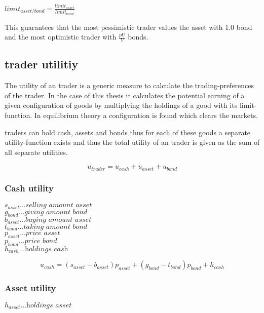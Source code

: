 \documentclass[../Bachelorarbeit.tex]{subfiles}
\begin{document}
\begin{center}
$limit_{asset/bond} = \frac{limit_{asset}}{limit_{bond}}$
\end{center}

This guarantees that the most pessimistic trader values the asset with 1.0 bond and the most optimistic trader with $\frac{pU}{V}$ bonds.

\subsection{trader utilitiy}
The utility of an trader is a generic measure to calculate the trading-preferences of the trader. In the case of this thesis it calculates the potential earning of a given configuration of goods by multiplying the holdings of a good with its limit-function. In equilibrium theory a configuration is found which clears the markets.

\medskip

traders can hold cash, assets and bonds thus for each of these goods a separate utility-function exists and thus the total utility of an trader is given as the sum of all separate utilities.

\begin{equation}
u_{trader} = u_{cash} + u_{asset} + u_{bond}
\end{equation}

\subsubsection{Cash utility}
$s_{asset} \dots \textit{selling amount asset}$ \\
$g_{bond} \dots \textit{giving amount bond}$ \\
$b_{asset} \dots \textit{buying amount asset}$ \\
$t_{bond} \dots \textit{taking amount bond}$ \\
$p_{asset} \dots \textit{price asset}$ \\
$p_{bond} \dots \textit{price bond}$ \\
$h_{cash} \dots \textit{holdings cash}$

\begin{equation}
u_{cash} = (s_{asset} - b_{asset} ) p_{asset} + (g_{bond} - t_{bond}) p_{bond} + h_{cash}
\end{equation}

\subsubsection{Asset utility}
$h_{asset} \dots \textit{holdings asset}$ 
\end{document}
